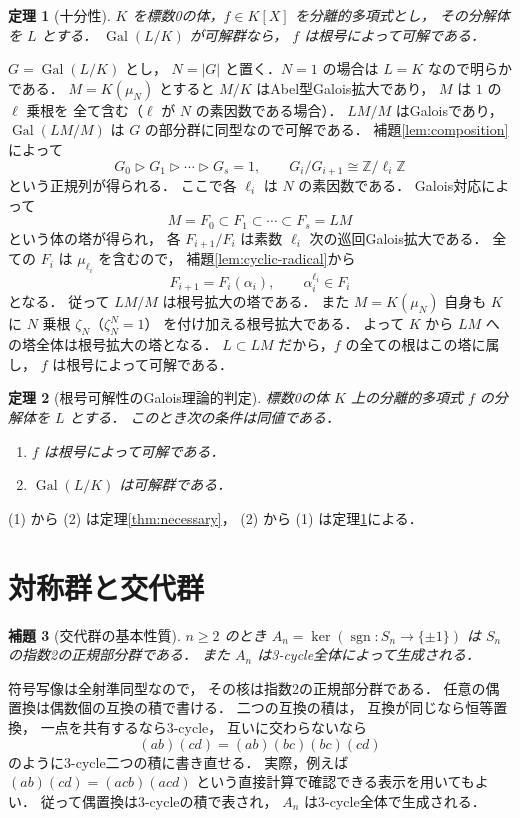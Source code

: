 \documentclass[a5paper,10pt,onecolumn]{jsarticle}
\makeatletter
\theoremstyle{mathnotetheorem}
\newtheorem{theorem}{定理}[section]
\newtheorem{lemma}[theorem]{補題}
\renewcommand{\proofname}{証明}
\renewenvironment{proof}[1][\proofname]{%
  \par\pushQED{\qed}\normalfont\topsep4\p@\@plus2\p@\relax
  \trivlist\item[\hskip\labelsep\bfseries #1]\ignorespaces
}{\popQED\endtrivlist\@endpefalse}
\makeatother
\begin{document}
\begin{theorem}[十分性]\label{thm:sufficient}
$K$ を標数0の体，$f\in K[X]$ を分離的多項式とし，
その分解体を $L$ とする．
$\operatorname{Gal}(L/K)$ が可解群なら，
$f$ は根号によって可解である．
\end{theorem}
\begin{proof}
$G=\operatorname{Gal}(L/K)$ とし，
$N=|G|$ と置く．$N=1$ の場合は $L=K$ なので明らかである．
$M=K(\mu_N)$ とすると
$M/K$ はAbel型Galois拡大であり，
$M$ は $1$ の $\ell$ 乗根を
全て含む（$\ell$ が $N$ の素因数である場合）．
$LM/M$ はGaloisであり，
$\operatorname{Gal}(LM/M)$ は
$G$ の部分群に同型なので可解である．
補題\ref{lem:composition}によって
\[
 G_0\triangleright G_1\triangleright\cdots
 \triangleright G_s=1,\qquad
 G_i/G_{i+1}\cong\mathbb Z/\ell_i\mathbb Z
\]
という正規列が得られる．
ここで各 $\ell_i$ は $N$ の素因数である．
Galois対応によって
\[
 M=F_0\subset F_1\subset\cdots\subset F_s=LM
\]
という体の塔が得られ，
各 $F_{i+1}/F_i$ は素数 $\ell_i$ 次の巡回Galois拡大である．
全ての $F_i$ は $\mu_{\ell_i}$ を含むので，
補題\ref{lem:cyclic-radical}から
\[
 F_{i+1}=F_i(\alpha_i),\qquad
 \alpha_i^{\ell_i}\in F_i
\]
となる．
従って $LM/M$ は根号拡大の塔である．
また $M=K(\mu_N)$ 自身も
$K$ に $N$ 乗根 $\zeta_N$（$\zeta_N^N=1$）
を付け加える根号拡大である．
よって $K$ から $LM$ への塔全体は根号拡大の塔となる．
$L\subset LM$ だから，$f$ の全ての根はこの塔に属し，
$f$ は根号によって可解である．
\end{proof}

\begin{theorem}[根号可解性のGalois理論的判定]\label{thm:iff}
標数0の体 $K$ 上の分離的多項式 $f$ の分解体を $L$ とする．
このとき次の条件は同値である．
\begin{enumerate}
\item $f$ は根号によって可解である．
\item $\operatorname{Gal}(L/K)$ は可解群である．
\end{enumerate}
\end{theorem}
\begin{proof}
(1) から (2) は定理\ref{thm:necessary}，
(2) から (1) は定理\ref{thm:sufficient}による．
\end{proof}

\section{対称群と交代群}

\begin{lemma}[交代群の基本性質]\label{lem:alternating}
$n\ge2$ のとき
$A_n=\ker(\operatorname{sgn}:S_n\to\{\pm1\})$
は $S_n$ の指数2の正規部分群である．
また $A_n$ は3-cycle全体によって生成される．
\end{lemma}
\begin{proof}
符号写像は全射準同型なので，
その核は指数2の正規部分群である．
任意の偶置換は偶数個の互換の積で書ける．
二つの互換の積は，
互換が同じなら恒等置換，
一点を共有するなら3-cycle，
互いに交わらないなら
\[
 (ab)(cd)=(ab)(bc)(bc)(cd)
\]
のように3-cycle二つの積に書き直せる．
実際，例えば
$(ab)(cd)=(acb)(acd)$
という直接計算で確認できる表示を用いてもよい．
従って偶置換は3-cycleの積で表され，
$A_n$ は3-cycle全体で生成される．
\end{proof}
\end{document}
